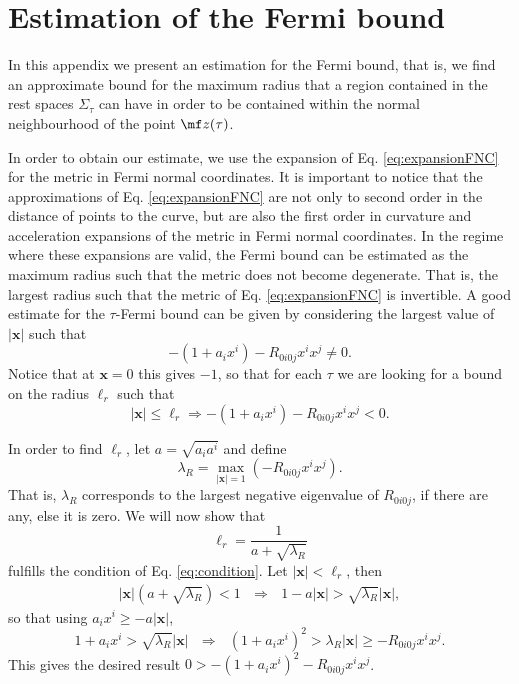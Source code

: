 \chapter{Estimation of the Fermi bound}\label{app:fermi}

In this appendix we present an estimation for the Fermi bound, that is, we find an approximate bound for the maximum radius that a region contained in the rest spaces $\Sigma_\tau$ can have in order to be contained within the normal neighbourhood of the point $\mf z(\tau)$.

In order to obtain our estimate, we use the expansion of Eq. \eqref{eq:expansionFNC} for the
metric in Fermi normal coordinates. It is important to notice that the approximations of Eq. \eqref{eq:expansionFNC} are not only to second order in the distance of points to the curve, but are also the first order in curvature and acceleration expansions of the metric in Fermi normal coordinates. In the regime where these expansions are valid, the Fermi bound can be estimated as the maximum radius such that the metric does not become degenerate. That is, the largest radius such that the metric of Eq. \eqref{eq:expansionFNC}
is invertible. A good estimate for the $\tau$-Fermi bound can be given by considering the largest value of $|\bm x|$ such that 
\begin{equation}
    -(1+a_i x^i) - R_{0i0j}x^ix^j \neq 0.
\end{equation}
Notice that at $\bm x = 0$ this gives $-1$, so that for each $\tau$ we are looking for a bound on the radius $\ell_r$ such that 
\begin{equation}\label{eq:condition}
    |\bm x| \leq \ell_r \Rightarrow -(1+a_i x^i) - R_{0i0j}x^ix^j < 0. 
\end{equation}

In order to find $\ell_r$, let $a = \sqrt{a_ia^i}$ and define
\begin{equation}
    \lambda_R = \max_{|\bm x| = 1}\left(-R_{0i0j}x^ix^j\right).
\end{equation}
That is, $\lambda_R$ corresponds to the largest negative eigenvalue of $R_{0i0j}$, if there are any, else it is zero. We will now show that
\begin{equation}
    \ell_r = \frac{1}{a+\sqrt{\lambda_R}}
\end{equation}
fulfills the condition of Eq. \eqref{eq:condition}. Let $|\bm x|<\ell_r$, then
\begin{align}
    |\bm x|(a + \sqrt{\lambda_R})<1 \:\:\:\Rightarrow\:\:\: 1 - a|\bm x| >\sqrt{\lambda_R}|\bm x|,
\end{align}
so that using $a_i x^i \geq -a |\bm x|$,
\begin{equation}\label{eq:noname}
    1 + a_i x^i> \sqrt{\lambda_R} |\bm x| \:\:\:\Rightarrow\:\:\: (1 + a_i x^i)^2 > \lambda_R |\bm x| \geq - R_{0i0j}x^i x^j.
\end{equation}
This gives the desired result $0>-(1 + a_i x^i)^2- R_{0i0j}x^i x^j$.

